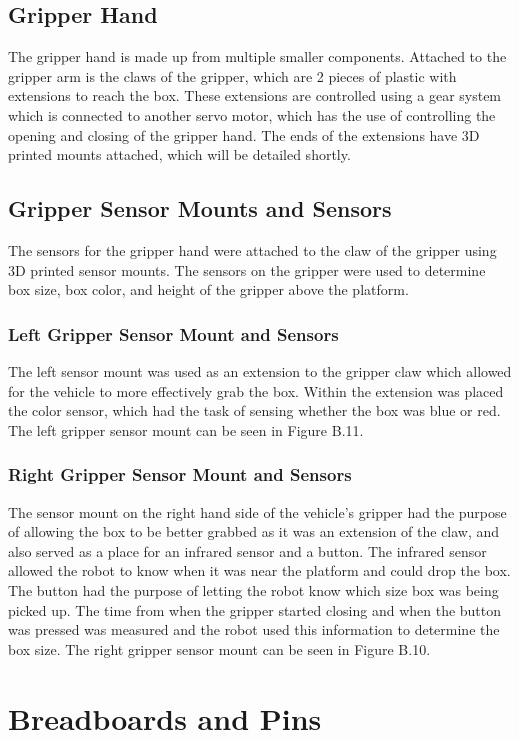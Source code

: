 \documentclass[11pt]{report}
\begin{document}
\subsection{Gripper Hand}
The gripper hand is made up from multiple smaller components. Attached to the gripper arm is the claws of the gripper, which are 2 pieces of plastic with extensions to reach the box. These extensions are controlled using a gear system which is connected to another servo motor, which has the use of controlling the opening and closing of the gripper hand. The ends of the extensions have 3D printed mounts attached, which will be detailed shortly. 
\subsection{Gripper Sensor Mounts and Sensors}
The sensors for the gripper hand were attached to the claw of the gripper using 3D printed sensor mounts. The sensors on the gripper were used to determine box size, box color, and height of the gripper above the platform. 
\subsubsection{Left Gripper Sensor Mount and Sensors}
The left sensor mount was used as an extension to the gripper claw which allowed for the vehicle to more effectively grab the box. Within the extension was placed the color sensor, which had the task of sensing whether the box was blue or red. The left gripper sensor mount can be seen in Figure B.11.
\subsubsection{Right Gripper Sensor Mount and Sensors}
The sensor mount on the right hand side of the vehicle’s gripper had the purpose of allowing the box to be better grabbed as it was an extension of the claw, and also served as a place for an infrared sensor and a button. The infrared sensor allowed the robot to know when it was near the platform and could drop the box. The button had the purpose of letting the robot know which size box was being picked up. The time from when the gripper started closing and when the button was pressed was measured and the robot used this information to determine the box size. The right gripper sensor mount can be seen in Figure B.10.

\section{Breadboards and Pins}\label{sec:breadboard-and-pins}
\end{document}
